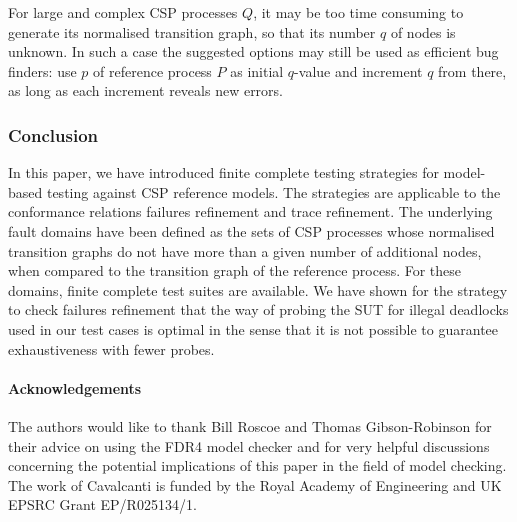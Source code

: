 For large and complex CSP processes $Q$, it may be too time consuming to
generate its normalised transition graph, so that its number $q$ of nodes is
unknown. In such a case the suggested options may still be used as efficient
bug finders: use  $p$ of reference process $P$ as initial $q$-value and
increment $q$ from there, as long as each increment reveals new errors.

\subsubsection*{Conclusion}

In this paper, we have introduced finite complete testing strategies for
model-based testing against CSP reference models. The strategies are
applicable to the conformance relations failures refinement and trace
refinement. The underlying fault domains have been defined as the sets of CSP
processes whose normalised transition graphs do not have more than a given
number of additional nodes, when compared to the transition graph of the
reference process. For these domains, finite complete test suites are
available. We have shown for the strategy to check failures refinement that
the way of probing the SUT for illegal deadlocks used in our test cases is
optimal in the sense that it is not possible to guarantee exhaustiveness with
fewer probes.


\paragraph{Acknowledgements}
The authors would like to thank Bill Roscoe and Thomas Gibson-Robinson for
their advice on using the FDR4 model checker and for very helpful discussions
concerning the potential implications of this paper in the field of model
checking. The work of Cavalcanti is funded by the Royal Academy of
Engineering and UK EPSRC Grant EP/R025134/1.
